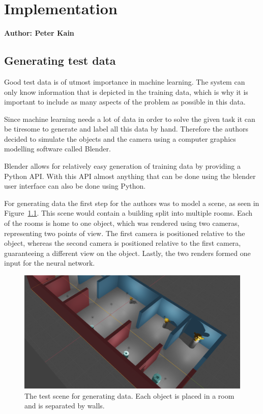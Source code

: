 \chapter{Implementation}

\textbf{Author: Peter Kain}

\section{Generating test data}
Good test data is of utmost importance in machine learning. The system can only know information that is depicted in the training data, which is why it is important to include as many aspects of the problem as possible in this data.

Since machine learning needs a lot of data in order to solve the given task it can be tiresome to generate and label all this data by hand. Therefore the authors decided to simulate the objects and the camera using a computer graphics modelling software called Blender.

Blender allows for relatively easy generation of training data by providing a Python API. With this API almost anything that can be done using the blender user interface can also be done using Python.

For generating data the first step for the authors was to model a scene, as seen in Figure~\ref{pic:implementation_generatingData_blenderSetup}. This scene would contain a building split into multiple rooms. Each of the rooms is home to one object, which was rendered using two cameras, representing two points of view. The first camera is positioned relative to the object, whereas the second camera is positioned relative to the first camera, guaranteeing a different view on the object. Lastly, the two renders formed one input for the neural network.

\begin{figure}[h!]
	\centering
	\includegraphics[width=5in]{img/implementation_generatingData_blenderSetup.png}
	\caption{The test scene for generating data. Each object is placed in a room and is separated by walls.}
	\label{pic:implementation_generatingData_blenderSetup}
\end{figure}

